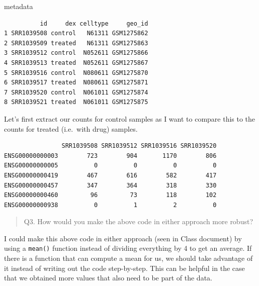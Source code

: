 \documentclass[
  letterpaper,
  DIV=11,
  numbers=noendperiod]{scrartcl}
\newenvironment{Shaded}{\begin{snugshade}}{\end{snugshade}}
\newcommand{\FunctionTok}[1]{\textcolor[rgb]{0.28,0.35,0.67}{#1}}
\newcommand{\NormalTok}[1]{\textcolor[rgb]{0.00,0.23,0.31}{#1}}
\newcommand{\OtherTok}[1]{\textcolor[rgb]{0.00,0.23,0.31}{#1}}
\newcommand{\SpecialCharTok}[1]{\textcolor[rgb]{0.37,0.37,0.37}{#1}}
\newcommand{\StringTok}[1]{\textcolor[rgb]{0.13,0.47,0.30}{#1}}
\begin{document}
\begin{Shaded}
\begin{Highlighting}[]
\NormalTok{metadata}
\end{Highlighting}
\end{Shaded}

\begin{verbatim}
          id     dex celltype     geo_id
1 SRR1039508 control   N61311 GSM1275862
2 SRR1039509 treated   N61311 GSM1275863
3 SRR1039512 control  N052611 GSM1275866
4 SRR1039513 treated  N052611 GSM1275867
5 SRR1039516 control  N080611 GSM1275870
6 SRR1039517 treated  N080611 GSM1275871
7 SRR1039520 control  N061011 GSM1275874
8 SRR1039521 treated  N061011 GSM1275875
\end{verbatim}

Let's first extract our counts for control samples as I want to compare
this to the counts for treated (i.e.~with drug) samples.

\begin{Shaded}
\end{Shaded}

\begin{verbatim}
                SRR1039508 SRR1039512 SRR1039516 SRR1039520
ENSG00000000003        723        904       1170        806
ENSG00000000005          0          0          0          0
ENSG00000000419        467        616        582        417
ENSG00000000457        347        364        318        330
ENSG00000000460         96         73        118        102
ENSG00000000938          0          1          2          0
\end{verbatim}

\begin{quote}
Q3. How would you make the above code in either approach more robust?
\end{quote}

I could make this above code in either approach (seen in Class document)
by using a \texttt{mean()} function instead of dividing everything by 4
to get an average. If there is a function that can compute a mean for
us, we should take advantage of it instead of writing out the code
step-by-step. This can be helpful in the case that we obtained more
values that also need to be part of the data.
\end{document}
